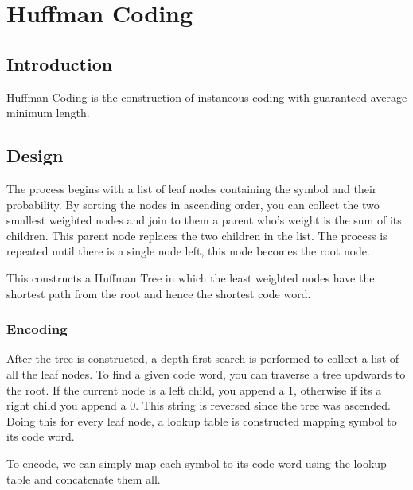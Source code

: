 \documentclass{article}
\begin{document}
\newpage

\begin{lstlisting}[language=bash]

\end{lstlisting}

\begin{verbatim}

\end{verbatim}


\section{Huffman Coding}

\subsection{Introduction}

Huffman Coding is the construction of instaneous coding with guaranteed average minimum length. 

\subsection{Design}

The process begins with a list of leaf nodes containing the symbol and their probability. By sorting the nodes in ascending order, you can collect the two smallest weighted nodes and join to them a parent who's weight is the sum of its children. This parent node replaces the two children in the list. The process is repeated until there is a single node left, this node becomes the root node.

This constructs a Huffman Tree in which the least weighted nodes have the shortest path from the root and hence the shortest code word.

\subsubsection{Encoding}

After the tree is constructed, a depth first search is performed to collect a list of all the leaf nodes. To find a given code word, you can traverse a tree updwards to the root. If the current node is a left child, you append a 1, otherwise if its a right child you append a 0. This string is reversed since the tree was ascended. Doing this for every leaf node, a lookup table is constructed mapping symbol to its code word.

To encode, we can simply map each symbol to its code word using the lookup table and concatenate them all.
\end{document}
